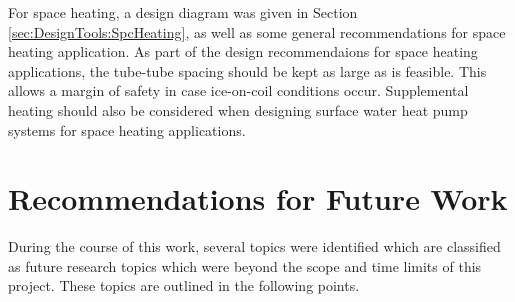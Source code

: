 For space heating, a design diagram was given in Section \ref{sec:DesignTools:SpcHeating}, as well as some general recommendations for space heating application. As part of the design recommendaions for space heating applications, the tube-tube spacing should be kept as large as is feasible. This allows a margin of safety in case ice-on-coil conditions occur. Supplemental heating should also be considered when designing surface water heat pump systems for space heating applications.


\section{Recommendations for Future Work}
During the course of this work, several topics were identified which are classified as future research topics which were beyond the scope and time limits of this project. These topics are outlined in the following points.

